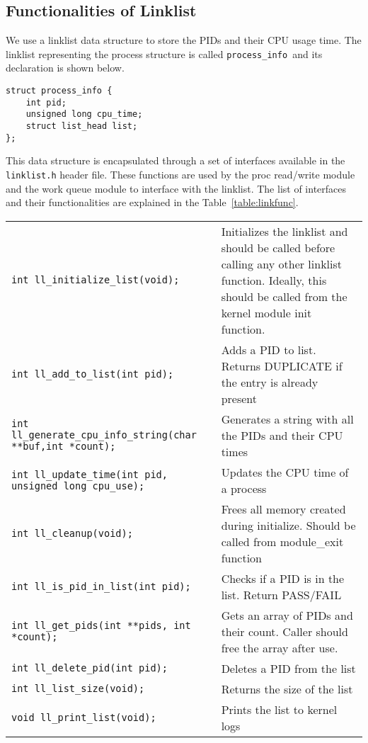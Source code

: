 \documentclass[11pt]{article}
\begin{document}
\subsection{Functionalities of Linklist}\label{subsec:Link}

We use a linklist data structure to store the PIDs and their CPU usage time. The linklist representing the process structure is called  {\tt process\_info }and its  declaration is shown below.

\begin{verbatim}
struct process_info {
    int pid;
    unsigned long cpu_time;
    struct list_head list; 
};
\end{verbatim}
This data structure is encapsulated through a set of interfaces available in the {\tt linklist.h} header file. These functions are used by the proc read/write module and the work queue module to interface with the linklist. The list of interfaces and their functionalities are explained in the Table~\ref{table:linkfunc}. 

\begin{table*}[h]
  \centering
  \rcow
  \caption{List of functions to access the linklist\label{table:linkfunc}}
  \begin{tabular}{|p{7cm}|p{8cm}|}
    {\tt int ll\_initialize\_list(void);}  &  Initializes the linklist and should be called before calling any other linklist function. Ideally, this should be called from the kernel module init function.  \\
    {\tt int ll\_add\_to\_list(int pid);}     &  Adds a PID to list. Returns DUPLICATE if the entry is already present  \\
    {\tt int ll\_generate\_cpu\_info\_string(char **buf,int *count);}&  Generates a string with all the PIDs and their CPU times\\
    {\tt int ll\_update\_time(int pid, unsigned long cpu\_use);}&  Updates the CPU time of a process\\
    {\tt int ll\_cleanup(void);}  & Frees all memory created during initialize. Should be called from module\_exit function  \\
    {\tt int ll\_is\_pid\_in\_list(int pid);}   & Checks if a PID is in the list. Return PASS/FAIL \\
    {\tt int ll\_get\_pids(int **pids, int *count);}    & Gets an array of PIDs and their count. Caller should free the array after use. \\
    {\tt int ll\_delete\_pid(int pid);}    & Deletes a PID from the list\\
    {\tt int ll\_list\_size(void);}    & Returns the size of the list \\
    {\tt void ll\_print\_list(void);}    & Prints the list to kernel logs\\
  \end{tabular}
\end{table*}
\end{document}
